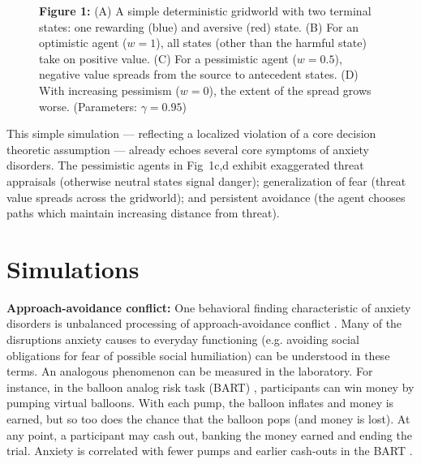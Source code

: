 \documentclass[11pt]{article} %
\begin{document}
\begin{figure}
  \centerline{%
  }
  \par \textbf{Figure 1:} (A) A simple deterministic gridworld with two terminal states: one rewarding (blue) and aversive (red) state. (B) For an optimistic agent ($w=1$), all states (other than the harmful state) take on positive value. (C) For a pessimistic agent ($w=0.5$), negative value spreads from the source to antecedent states. (D) With increasing pessimism ($w=0$), the extent of the spread grows worse. (Parameters: $\gamma = 0.95$)
\end{figure}

This simple simulation --- reflecting a localized violation of a core decision theoretic assumption --- already echoes several core symptoms of anxiety disorders. The pessimistic agents in Fig~1c,d exhibit exaggerated threat appraisals (otherwise neutral states signal danger); generalization of fear (threat value spreads across the gridworld); and persistent avoidance (the agent chooses paths which maintain increasing distance from threat).

\section{Simulations}
\textbf{Approach-avoidance conflict:} One behavioral finding characteristic of anxiety disorders is unbalanced processing of approach-avoidance conflict \citep{aupperle2010}. Many of the disruptions anxiety causes to everyday functioning (e.g. avoiding social obligations for fear of possible social humiliation) can be understood in these terms. An analogous phenomenon can be measured in the laboratory. For instance, in the balloon analog risk task (BART) \citep{Lejuez2002}, participants can win money by pumping virtual balloons. With each pump, the balloon inflates and money is earned, but so too does the chance that the balloon pops (and money is lost). At any point, a participant may cash out, banking the money earned and ending the trial. Anxiety is correlated with fewer pumps and earlier cash-outs in the BART \citep{Maner2007, ramirez2015}.
\end{document}
